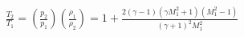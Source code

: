 \documentclass[10pt]{article}
\begin{document}
\begin{align*}\frac{T_2}{T_1}
=
\left( \frac{p_2}{p_1} \right)
\left( \frac{\rho_1}{\rho_2} \right)
=
1+\frac{2 \left( \gamma-1 \right)\left( \gamma M_{1}^{2} + 1 \right) \left( M_{1}^{2}- 1 \right) }{\left( \gamma+1 \right)^2 M_{1}^{2}}\end{align*}
\end{document}
